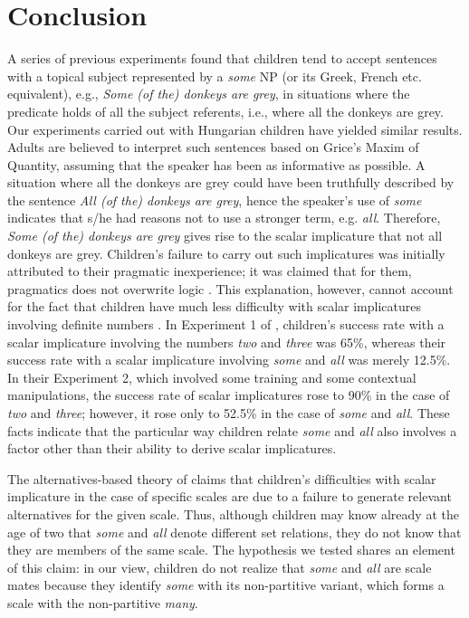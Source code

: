 \documentclass[output=paper]{langscibook}
\begin{document}
\section{Conclusion}\label{kis-zet:sec:conclusion}

A series of previous experiments \citep[e.g.][]{noveck2001children,papafragou2003scalar,miller2005young,papafragouskordos16,pouscoulous2007developmental} found that children tend to accept sentences with a topical subject represented by a \textit{some} NP (or its Greek, French etc. equivalent), e.g., \textit{Some (of the) donkeys are grey}, in situations where the predicate holds of all the subject referents, i.e., where all the donkeys are grey. Our experiments carried out with Hungarian children have yielded similar results. Adults are believed to interpret such sentences based on Grice's Maxim of Quantity, assuming that the speaker has been as informative as possible. A situation where all the donkeys are grey could have been truthfully described by the sentence \textit{All (of the) donkeys are grey}, hence the speaker's use of \textit{some} indicates that s/he had reasons not to use a stronger term, e.g. \textit{all}. Therefore, \textit{Some (of the) donkeys are grey} gives rise to the scalar implicature that not all donkeys are grey. Children's failure to carry out such implicatures was initially attributed to their pragmatic inexperience; it was claimed that for them, pragmatics does not overwrite logic \citep{noveck2001children}. This explanation, however, cannot account for the fact that children have much less difficulty with scalar implicatures involving definite numbers \citep[cf. e.g.,][]{papafragou2003scalar,ekisszt18}. In Experiment 1 of \citet{papafragou2003scalar}, children’s success rate with a scalar implicature involving the numbers \textit{two} and \textit{three} was 65\%, whereas their success rate with a scalar implicature involving \textit{some} and \textit{all} was merely 12.5\%. In their Experiment 2, which involved some training and some contextual manipulations, the success rate of scalar implicatures rose to 90\% in the case of \textit{two} and \textit{three}; however, it rose only to 52.5\% in the case of \textit{some} and \textit{all}. These facts indicate that the particular way children relate \textit{some} and \textit{all} also involves a factor other than their ability to derive scalar implicatures.

The alternatives-based theory of \citet{barner2011accessing} claims that children’s difﬁculties with scalar implicature in the case of specific scales are due to a failure to generate relevant alternatives for the given scale. Thus, although children may know already at the age of two that \textit{some} and \textit{all} denote different set relations, they do not know that they are members of the same scale. The hypothesis we tested shares an element of this claim: in our view, children do not realize that \textit{some} and \textit{all} are scale mates because they identify \textit{some} with its non-partitive variant, which forms a scale with the non-partitive \textit{many}. 
\end{document}
